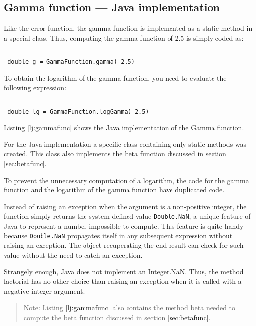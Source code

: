 \documentclass[twoside]{book}
\begin{document}
\subsection{Gamma function --- Java implementation}
 Like the error function, the gamma
function is implemented as a static method in a special class.
Thus, computing the gamma function of 2.5 is simply coded as:
\begin{codeExample}
\begin{verbatim}

 double g = GammaFunction.gamma( 2.5)
\end{verbatim}
\end{codeExample}
To obtain the logarithm of the gamma function, you need to
evaluate the following expression:
\begin{codeExample}
\begin{verbatim}

 double lg = GammaFunction.logGamma( 2.5)
\end{verbatim}
\end{codeExample}
Listing \ref{lj:gammafunc} shows the Java implementation of the
Gamma function.

For the Java implementation a specific class containing only
static methods was created. This class also implements the beta
function discussed in section \ref{sec:betafunc}.

To prevent the unnecessary computation of a logarithm, the code
for the gamma function and the logarithm of the gamma function
have duplicated code.

Instead of raising an exception when the argument is a
non-positive integer, the function simply returns the system
defined value {\tt Double.NaN}, a unique feature of Java to
represent a number impossible to compute. This feature is quite
handy because {\tt Double.NaN} propagates itself in any subsequent
expression without raising an exception. The object recuperating
the end result can check for such value without the need to catch
an exception.

Strangely enough, Java does not implement an Integer.NaN. Thus,
the method factorial has no other choice than raising an exception
when it is called with a negative integer argument.

\begin{listing}
\label{lj:gammafunc}

\end{listing}
\begin{quote}
Note: Listing \ref{lj:gammafunc} also contains the method beta
needed to compute the beta function discussed in section
\ref{sec:betafunc}.
\end{quote}
\end{document}
